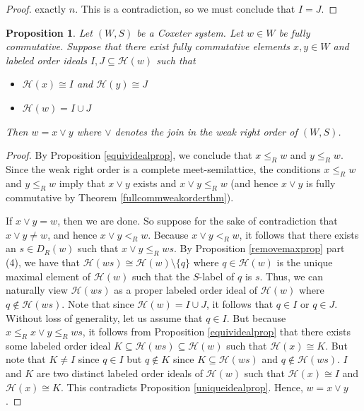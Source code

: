 \documentclass{amsart}
\theoremstyle{plain} %
\newtheorem{prop}[thm]{Proposition}
\theoremstyle{definition}
\def\weakr{\leq_{R}}
\def\sweakr{<_{R}}
\def\H#1{\mathcal{H}(#1)}
\begin{document}
\begin{proof}
exactly $n$. This is a contradiction, so we must conclude that $ I = J$.
\end{proof}

\begin{prop} \label{joinidealprop}
    Let $ (W,S)$ be a Coxeter system. Let $ w\in W$ be fully commutative. Suppose that there exist fully commutative elements $ x,y \in W$ and labeled order ideals $ I , J \subseteq \H{w}$ such that

    \begin{itemize}
        \item $ \H{x} \cong I$ and $ \H{y} \cong J$

        \item $ \H{w} = I \cup J$
    \end{itemize}
    Then $ w = x \vee y$ where $ \vee $ denotes the join in the weak right order of $(W,S)$.
\end{prop}

\begin{proof}
    By Proposition \ref{equividealprop}, we conclude that $ x\weakr w$ and $ y \weakr w$. Since the weak right order is a complete meet-semilattice, the conditions $ x \weakr w$ and $ y \weakr w$ imply that $ x \vee y$ exists and $ x \vee y \weakr w$ (and hence $ x\vee y$ is fully commutative by Theorem \ref{fullcommweakorderthm}). 
    
    If $ x \vee y = w$, then we are done. So suppose for the sake of contradiction that $ x\vee y \neq w$, and hence $ x \vee y \sweakr w$. Because $ x \vee y \sweakr w$, it follows that there exists an $ s\in D_{R}(w)$ such that $ x\vee y \weakr ws$. By Proposition \ref{removemaxprop} part (4), we have that $ \H{ws} \cong \H{w} \setminus \{ q \}$ where $q\in \H{w}$ is the unique maximal element of $ \H{w}$ such that the $S$-label of $ q$ is $s$. Thus, we can naturally view $ \H{ws}$ as a proper labeled order ideal of $ \H{w}$ where $ q \notin \H{ws}$. Note that since $ \H{w} = I \cup J$, it follows that $ q \in I$ or $ q\in J$. Without loss of generality, let us assume that $ q\in I$. But because $ x \weakr x\vee y \weakr ws$, it follows from Proposition \ref{equividealprop} that there exists some labeled order ideal $K \subseteq \H{ws} \subseteq \H{w}$ such that $ \H{x} \cong K$. But note that $ K \neq I$ since $ q\in I$ but $ q\notin K$ since $ K \subseteq \H{ws}$ and $ q\notin \H{ws}$. $I$ and $K$ are two distinct labeled order ideals of $ \H{w}$ such that $ \H{x} \cong I$ and $ \H{x} \cong K$. This contradicts Proposition \ref{uniqueidealprop}. Hence, $ w = x\vee y$.
\end{proof}
\end{document}
